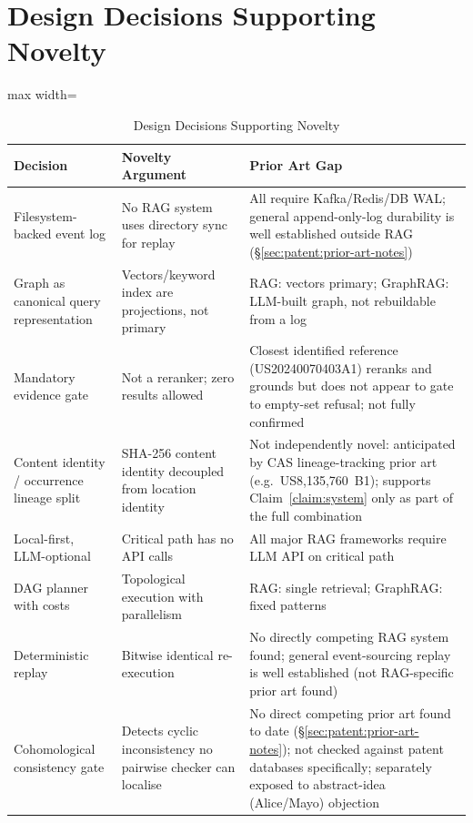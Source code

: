 \section{Design Decisions Supporting Novelty}
\label{sec:patent:decisions}

\begin{table}[htbp]
\centering
\caption{Design Decisions Supporting Novelty}
\label{tab:patent:decisions}
\begin{adjustbox}{max width=\textwidth}
\begin{tabular}{lll}
\toprule
\textbf{Decision} & \textbf{Novelty Argument} & \textbf{Prior Art Gap} \\
\midrule
Filesystem-backed event log & No RAG system uses directory sync for replay & All require Kafka/Redis/DB WAL; general append-only-log durability is well established outside RAG (\S\ref{sec:patent:prior-art-notes}) \\
Graph as canonical query representation & Vectors/keyword index are projections, not primary & RAG: vectors primary; GraphRAG: LLM-built graph, not rebuildable from a log \\
Mandatory evidence gate & Not a reranker; zero results allowed & Closest identified reference (US20240070403A1) reranks and grounds but does not appear to gate to empty-set refusal; not fully confirmed \\
Content identity / occurrence lineage split & SHA-256 content identity decoupled from location identity & Not independently novel: anticipated by CAS lineage-tracking prior art (e.g.\ US8,135,760~B1); supports Claim~\ref{claim:system} only as part of the full combination \\
Local-first, LLM-optional & Critical path has no API calls & All major RAG frameworks require LLM API on critical path \\
DAG planner with costs & Topological execution with parallelism & RAG: single retrieval; GraphRAG: fixed patterns \\
Deterministic replay & Bitwise identical re-execution & No directly competing RAG system found; general event-sourcing replay is well established (not RAG-specific prior art found) \\
Cohomological consistency gate & Detects cyclic inconsistency no pairwise checker can localise & No direct competing prior art found to date (\S\ref{sec:patent:prior-art-notes}); not checked against patent databases specifically; separately exposed to abstract-idea (Alice/Mayo) objection \\
\bottomrule
\end{tabular}
\end{adjustbox}
\end{table}

